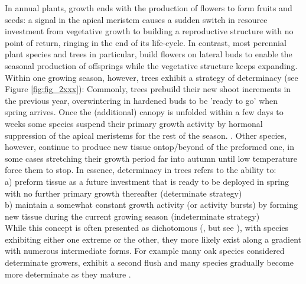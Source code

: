\documentclass{article}
\begin{document}
In annual plants, growth ends with the production of flowers to form fruits and seeds: a signal in the apical meristem causes a sudden switch in resource investment from vegetative growth to building a reproductive structure with no point of return, ringing in the end of its life-cycle. In contrast, most perennial plant species and trees in particular, build flowers on lateral buds to enable the seasonal production of offsprings while the vegetative structure keeps expanding. \\

Within one growing season, however, trees exhibit a strategy of determinacy (see Figure \ref{fig:fig_2xxx}): Commonly, trees prebuild their new shoot increments in the previous year, overwintering in hardened buds to be 'ready to go' when spring arrives. Once the (additional) canopy is unfolded within a few days to weeks some species suspend their primary growth activity by hormonal suppression of the apical meristems for the rest of the season.  \citep[paradormancy,][]{langEndoParaEcodormancy1987}.  Other species, however, continue to produce new tissue ontop/beyond of the preformed one, in some cases stretching their growth period far into autumn until low temperature force them to stop. In essence, determinacy in trees refers to the ability to:\\
a) preform tissue as a future investment that is ready to be deployed in spring with no further primary growth thereafter (determinate strategy)\\
b) maintain a somewhat constant growth activity (or activity bursts) by forming new tissue during the current growing season (indeterminate strategy)\\

While this concept is often presented as dichotomous (\cite{kozlowskiGrowthControlWoody1997, lechowiczWhyTemperateDeciduous1984a}, but see \citet{kikuzawaLeafSurvivalWoody1983, damascosBudCompositionBranching2005}), with species exhibiting either one extreme or the other, they more likely exist along a gradient with numerous intermediate forms. For example many oak species considered determinate growers, exhibit a second flush and many species gradually become more determinate as they mature \citep{borchertConceptJuvenilityWoody1976, heuretOntogeneticTrendsMorphological2006}.
	
\end{document}
